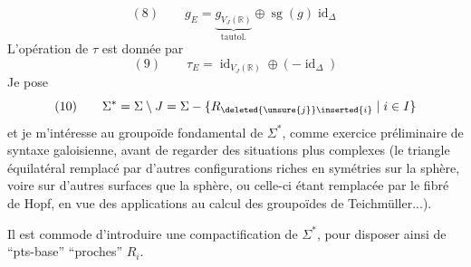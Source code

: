 \[
(8)\qquad g_E=\underbrace{g_{V_J(\mathbb R)}}_{\text{tautol.}}\oplus\operatorname{sg}(g)\operatorname{id}_\Delta
\]
L'opération de $\tau$ est donnée par
\[
(9)\qquad\tau_E=\operatorname{id}_{V_J(\mathbb R)}\oplus(-\operatorname{id}_\Delta)
\]
Je pose
\[
(10)\qquad\Sigma^*=\Sigma\setminus J=\Sigma-\{R_{\deleted{\unsure{j}}\inserted{i}}\mid i\in I\}
\]
et je m'intéresse au groupoïde fondamental de $\Sigma^*$, comme exercice préliminaire de syntaxe galoisienne, avant de regarder des situations  plus complexes (le triangle équilatéral remplacé par d'autres configurations riches en symétries sur la sphère, voire sur d'autres surfaces que la sphère, ou celle-ci étant remplacée par le fibré de Hopf, en vue des applications au calcul des groupoïdes de Teichmüller...).

Il est commode d'introduire une compactification de $\Sigma^*$, pour disposer ainsi de ``pts-base'' ``proches''  $R_i$.
